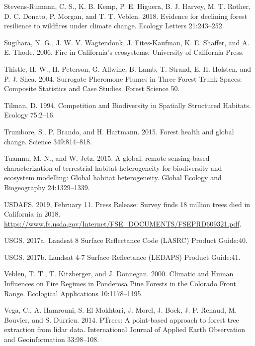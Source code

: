 \documentclass[twoside,12pt,final]{ucthesis-CA2012}
\begin{document}
\begin{ucmainmatter}
\hypertarget{ref-stevens-rumann2018}{}
Stevens-Rumann, C. S., K. B. Kemp, P. E. Higuera, B. J. Harvey, M. T.
Rother, D. C. Donato, P. Morgan, and T. T. Veblen. 2018. Evidence for
declining forest resilience to wildfires under climate change. Ecology
Letters 21:243--252.

\hypertarget{ref-sugihara2006}{}
Sugihara, N. G., J. W. V. Wagtendonk, J. Fites-Kaufman, K. E. Shaffer,
and A. E. Thode. 2006. Fire in California's ecosystems. University of
California Press.

\hypertarget{ref-thistle2004}{}
Thistle, H. W., H. Peterson, G. Allwine, B. Lamb, T. Strand, E. H.
Holsten, and P. J. Shea. 2004. Surrogate Pheromone Plumes in Three
Forest Trunk Spaces: Composite Statistics and Case Studies. Forest
Science 50.

\hypertarget{ref-tilman1994}{}
Tilman, D. 1994. Competition and Biodiversity in Spatially Structured
Habitats. Ecology 75:2--16.

\hypertarget{ref-trumbore2015}{}
Trumbore, S., P. Brando, and H. Hartmann. 2015. Forest health and global
change. Science 349:814--818.

\hypertarget{ref-tuanmu2015}{}
Tuanmu, M.-N., and W. Jetz. 2015. A global, remote sensing-based
characterization of terrestrial habitat heterogeneity for biodiversity
and ecosystem modelling: Global habitat heterogeneity. Global Ecology
and Biogeography 24:1329--1339.

\hypertarget{ref-usdafs2019}{}
USDAFS. 2019, February 11. Press Release: Survey finds 18 million trees
died in California in 2018.
\url{https://www.fs.usda.gov/Internet/FSE_DOCUMENTS/FSEPRD609321.pdf}.

\hypertarget{ref-usgs2017a}{}
USGS. 2017a. Landsat 8 Surface Reflectance Code (LASRC) Product
Guide:40.

\hypertarget{ref-usgs2017}{}
USGS. 2017b. Landsat 4-7 Surface Reflectance (LEDAPS) Product Guide:41.

\hypertarget{ref-veblen2000}{}
Veblen, T. T., T. Kitzberger, and J. Donnegan. 2000. Climatic and Human
Influences on Fire Regimes in Ponderosa Pine Forests in the Colorado
Front Range. Ecological Applications 10:1178--1195.

\hypertarget{ref-vega2014}{}
Vega, C., A. Hamrouni, S. El Mokhtari, J. Morel, J. Bock, J. P. Renaud,
M. Bouvier, and S. Durrieu. 2014. PTrees: A point-based approach to
forest tree extraction from lidar data. International Journal of Applied
Earth Observation and Geoinformation 33:98--108.


\end{ucmainmatter}
\end{document}
